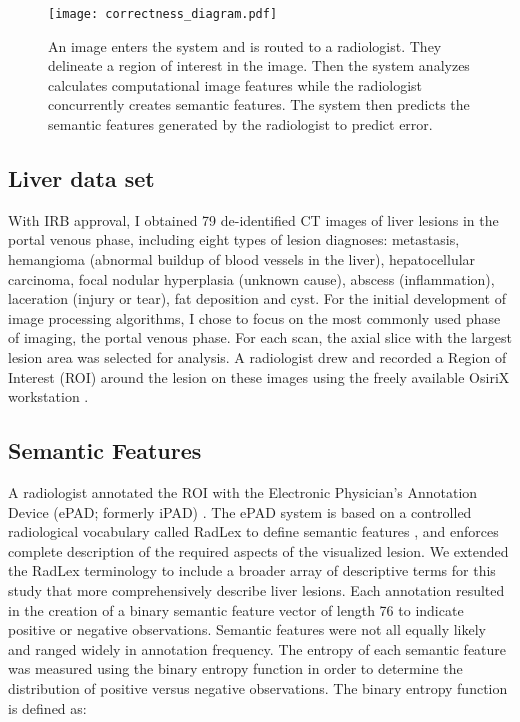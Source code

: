 \begin{figure}[h]
	\centering
	\texttt{[image: correctness\_diagram.pdf]}
	\caption[Overview of the the annotation verification system]{An image enters the system and is routed to a radiologist. They delineate a region of interest in the image. Then the system analyzes calculates computational image features while the radiologist concurrently creates semantic features. The system then predicts the semantic features generated by the radiologist to predict error.}
	\label{fig:correctness_diagram}
\end{figure}

\subsection{Liver data set}
With IRB approval, I obtained 79 de-identified CT images of liver lesions in the portal venous phase, including eight types of lesion diagnoses: metastasis, hemangioma (abnormal buildup of blood vessels in the liver), hepatocellular carcinoma, focal nodular hyperplasia (unknown cause), abscess (inflammation), laceration (injury or tear), fat deposition and cyst. For the initial development of image processing algorithms, I chose to focus on the most commonly used phase of imaging, the portal venous phase. For each scan, the axial slice with the largest lesion area was selected for analysis. A radiologist drew and recorded a Region of Interest (ROI) around the lesion on these images using the freely available OsiriX workstation \cite{Armato:2007ks,Rosset:2004kk}.


\subsection{Semantic Features}
A radiologist annotated the ROI with the Electronic Physician's Annotation Device (ePAD; formerly iPAD) \cite{Napel:2010vb, Rubin:2008uz}. The ePAD system is based on a controlled radiological vocabulary called RadLex to define semantic features \cite{Korenblum:2011gx, Langlotz:2006jn}, and enforces complete description of the required aspects of the visualized lesion. We extended the RadLex terminology to include a broader array of descriptive terms for this study that more comprehensively describe liver lesions. Each annotation resulted in the creation of a binary semantic feature vector of length 76 to indicate positive or negative observations.
Semantic features were not all equally likely and ranged widely in annotation frequency. The entropy of each semantic feature was measured using the binary entropy function in order to determine the distribution of positive versus negative observations. The binary entropy function is defined as:

